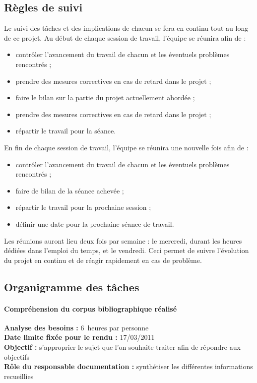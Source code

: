 \subsection{Règles de suivi}
Le suivi des tâches et des implications de chacun se fera en continu tout au long de ce projet. Au début de chaque session de travail, l'équipe se réunira afin de :
\begin{itemize}
  \item contrôler l'avancement du travail de chacun et les éventuels problèmes rencontrés ;
  \item prendre des mesures correctives en cas de retard dans le projet ;
  \item faire le bilan sur la partie du projet actuellement abordée ;
  \item prendre des mesures correctives en cas de retard dans le projet ;
  \item répartir le travail pour la séance.
\end{itemize}

\medskip
En fin de chaque session de travail, l'équipe se réunira une nouvelle fois afin de :
\begin{itemize}
  \item contrôler l'avancement du travail de chacun et les éventuels problèmes rencontrés ;
  \item faire de bilan de la séance achevée ;
  \item répartir le travail pour la prochaine session ;
  \item définir une date pour la prochaine séance de travail.
\end{itemize}

Les réunions auront lieu deux fois par semaine : le mercredi, durant les heures dédiées dans l'emploi du temps, et le vendredi. Ceci permet de suivre l'évolution du projet en continu et de réagir rapidement en cas de problème.


\subsection{Organigramme des tâches}
\paragraph*{Compréhension du corpus bibliographique réalisé\\}
\textbf{Analyse des besoins :} 6~heures par personne\\
\textbf{Date limite fixée pour le rendu :} 17/03/2011\\
\textbf{Objectif : }s'approprier le sujet que l'on souhaite traiter afin de répondre aux objectifs\\
\textbf{Rôle du responsable documentation :} synthétiser les différentes informations recueillies

